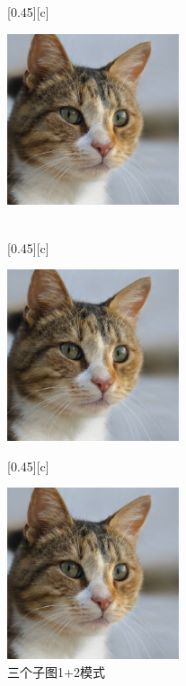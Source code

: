 \documentclass[12pt,a4paper,UTF8]{article}
\begin{document}
    \begin{figure}[!htbp]
        \centering
        [0.45\textwidth][c]{
            \centering
            \includegraphics[width=0.45\textwidth]{example}
             
        }\\%
        [0.45\textwidth][c]{
            \centering
            \includegraphics[width=0.45\textwidth]{example}
             
        }%
        \hspace{0.3cm}
        [0.45\textwidth][c]{
            \centering
            \includegraphics[width=0.45\textwidth]{example}
             
        }%
        \caption{三个子图1+2模式}
         
    \end{figure}
\end{document}
